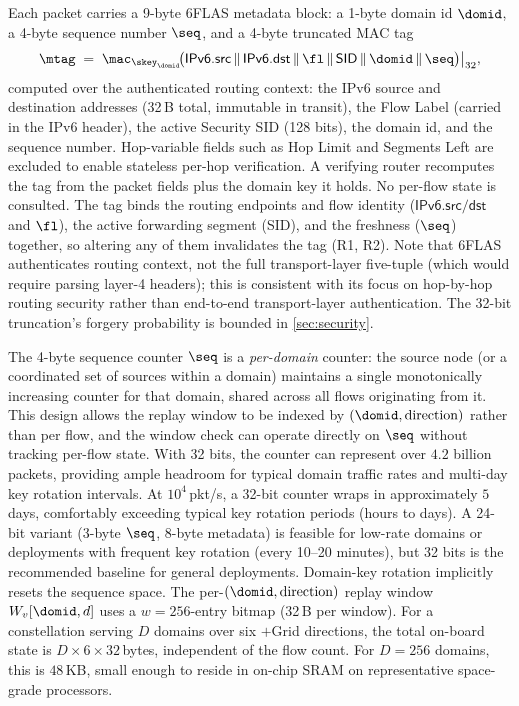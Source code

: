 Each packet carries a 9-byte 6FLAS metadata block: a 1-byte domain id $\domid$,
a 4-byte sequence number $\seq$, and a 4-byte truncated MAC tag
\begin{equation}
\label{eq:tag}
\mtag \;=\; \mac_{\skey_\domid}\!\bigl(\textsf{IPv6.src} \,\|\, \textsf{IPv6.dst} \,\|\, \fl \,\|\, \textsf{SID} \,\|\, \domid \,\|\, \seq\bigr)\big|_{32},
\end{equation}
computed over the authenticated routing context: the IPv6 source and destination addresses (32\,B total, immutable in transit), the Flow Label (carried in the IPv6 header), the active Security SID (128 bits), the domain id, and the sequence number. Hop-variable fields such as Hop Limit and Segments Left are excluded to enable stateless per-hop verification. A verifying router recomputes the tag from
the packet fields plus the domain key it holds. No per-flow state is
consulted. The tag binds the routing endpoints and flow identity ($\textsf{IPv6.src/dst}$ and $\fl$), the active forwarding segment
(\textsf{SID}), and the freshness ($\seq$) together, so altering any of them
invalidates the tag (R1, R2). Note that 6FLAS authenticates routing context, not the full transport-layer five-tuple (which would require parsing layer-4 headers); this is consistent with its focus on hop-by-hop routing security rather than end-to-end transport-layer authentication. The 32-bit truncation's forgery probability is bounded in \cref{sec:security}.

The 4-byte sequence counter $\seq$ is a \emph{per-domain} counter: the source node (or a coordinated set of sources within a domain) maintains a single monotonically increasing counter for that domain, shared across all flows originating from it. This design allows the replay window to be indexed by $(\domid, \text{direction})$ rather than per flow, and the window check can operate directly on $\seq$ without tracking per-flow state. With 32 bits, the counter can represent over $4.2$ billion packets, providing ample headroom for typical domain traffic rates and multi-day key rotation intervals. At $10^4$\,pkt/s, a 32-bit counter wraps in approximately $5$ days, comfortably exceeding typical key rotation periods (hours to days). A 24-bit variant (3-byte $\seq$, 8-byte metadata) is feasible for low-rate domains or deployments with frequent key rotation (every 10--20 minutes), but 32 bits is the recommended baseline for general deployments.
Domain-key rotation implicitly resets the sequence space. The per-$(\domid, \text{direction})$ replay window $W_v[\domid, d]$ uses a
$w=256$-entry bitmap (32\,B per window). For a constellation serving $D$ domains over six $+$Grid directions, the total on-board state is
$D \times 6 \times 32$\,bytes, independent of the flow
count. For $D=256$ domains, this is $48$\,KB, small enough to reside in on-chip SRAM on representative space-grade processors.

